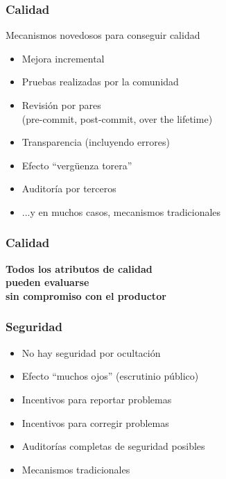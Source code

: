 \documentclass[17pt,aspectratio=169]{beamer}
\begin{document}

\begin{frame}
\frametitle{Calidad}

{\small

Mecanismos novedosos para conseguir calidad

\begin{itemize}
\item Mejora incremental
\item Pruebas realizadas por la comunidad
\item Revisión por pares \\
  (pre-commit, post-commit, over the lifetime) \\
\item Transparencia (incluyendo errores)
\item Efecto ``vergüenza torera''
\item Auditoría por terceros
\item ...y en muchos casos, mecanismos tradicionales
\end{itemize}

}
\end{frame}


\begin{frame}
\frametitle{Calidad}

\begin{center}
  {\bf Todos los atributos de calidad \\
    pueden evaluarse \\
    sin compromiso con el productor \\}
\end{center}
\end{frame}


\begin{frame}
\frametitle{Seguridad}

\begin{itemize}
\item No hay seguridad por ocultación
\item Efecto ``muchos ojos'' (escrutinio público)
\item Incentivos para reportar problemas
\item Incentivos para corregir problemas
\item Auditorías completas de seguridad posibles
\item Mecanismos tradicionales
\end{itemize}

\end{frame}
\end{document}
